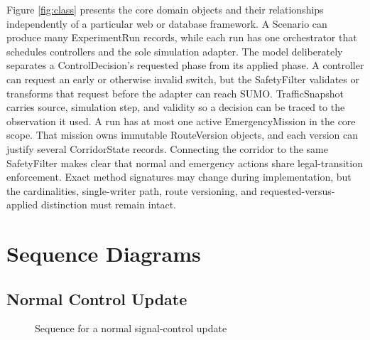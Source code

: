 Figure \ref{fig:class} presents the core domain objects and their relationships independently of a particular web or database framework. A Scenario can produce many ExperimentRun records, while each run has one orchestrator that schedules controllers and the sole simulation adapter. The model deliberately separates a ControlDecision's requested phase from its applied phase. A controller can request an early or otherwise invalid switch, but the SafetyFilter validates or transforms that request before the adapter can reach SUMO. TrafficSnapshot carries source, simulation step, and validity so a decision can be traced to the observation it used. A run has at most one active EmergencyMission in the core scope. That mission owns immutable RouteVersion objects, and each version can justify several CorridorState records. Connecting the corridor to the same SafetyFilter makes clear that normal and emergency actions share legal-transition enforcement. Exact method signatures may change during implementation, but the cardinalities, single-writer path, route versioning, and requested-versus-applied distinction must remain intact.

\section{Sequence Diagrams}
\label{sec:sequences}

\subsection{Normal Control Update}

\begin{figure}[htbp]
\centering
{}
\caption{Sequence for a normal signal-control update}
\label{fig:seq-normal}
\end{figure}


